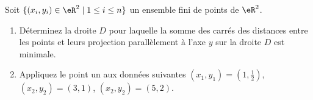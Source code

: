 
\begin{exercice}\label{exoOptimSS0004}

Soit $\{ (x_i,y_i) \in \eR^2 \mid 1 \leq i \leq n \}$ un ensemble fini de 
points de $\eR^2$. 
\begin{enumerate}
\item
Déterminez la droite $D$ pour laquelle la somme des carrés des 
distances entre les points et leurs projection parallèlement à l'axe 
$y$ sur la droite $D$ est minimale.
\item
Appliquez le point un aux données suivantes $(x_1,y_1) = (1, \frac12)$, 
$(x_2,y_2) = (3, 1)$, $(x_2,y_2) = (5, 2)$.
\end{enumerate}


\end{exercice}
